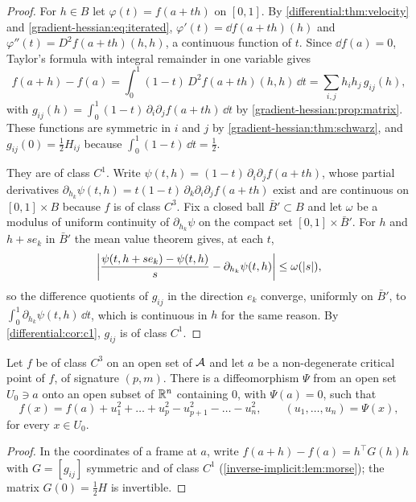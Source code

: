 \begin{notechapter}
\begin{proof}
For $h\in B$ let $\varphi(t) = f(a + th)$ on $[0, 1]$. By
\cref{differential:thm:velocity} and
\eqref{gradient-hessian:eq:iterated},
$\varphi'(t) = \dd f(a + th)(h)$ and
$\varphi''(t) = D^2f(a + th)(h, h)$, a continuous function of $t$. Since
$\dd f(a) = 0$, Taylor's formula with integral remainder in one variable
gives
\[
  f(a + h) - f(a) = \int_0^1(1 - t)\,D^2f(a + th)(h, h)\,\dd t
  = \sum_{i,j}h_ih_j\,g_{ij}(h) ,
\]
with
$g_{ij}(h) = \int_0^1(1 - t)\,\partial_i\partial_jf(a + th)\,\dd t$ by
\cref{gradient-hessian:prop:matrix}. These functions are symmetric in
$i$ and $j$ by \cref{gradient-hessian:thm:schwarz}, and
$g_{ij}(0) = \frac12H_{ij}$ because $\int_0^1(1 - t)\,\dd t = \frac12$.

They are of class $C^1$. Write
$\psi(t, h) = (1 - t)\,\partial_i\partial_jf(a + th)$, whose partial
derivatives
$\partial_{h_k}\psi(t, h)
= t(1 - t)\,\partial_k\partial_i\partial_jf(a + th)$
exist and are continuous on $[0, 1]\times B$ because $f$ is of class
$C^3$. Fix a closed ball $\bar B'\subset B$ and let $\omega$ be a
modulus of uniform continuity of $\partial_{h_k}\psi$ on the compact set
$[0, 1]\times\bar B'$. For $h$ and $h + se_k$ in $\bar B'$ the mean
value theorem gives, at each $t$,
\[
  \left|\frac{\psi(t, h + se_k) - \psi(t, h)}s
  - \partial_{h_k}\psi(t, h)\right|\leq\omega(\left|s\right|) ,
\]
so the difference quotients of $g_{ij}$ in the direction $e_k$ converge,
uniformly on $\bar B'$, to $\int_0^1\partial_{h_k}\psi(t, h)\,\dd t$,
which is continuous in $h$ for the same reason. By
\cref{differential:cor:c1}, $g_{ij}$ is of class $C^1$.
\end{proof}

\begin{theorem}\label{inverse-implicit:thm:morse}
Let $f$ be of class $C^3$ on an open set of $\mathcal{A}$ and let $a$ be a
non-degenerate critical point of $f$, of signature $(p, m)$. There is a
diffeomorphism $\Psi$ from an open set $U_0\ni a$ onto an open subset of
$\mathbb{R}^n$ containing $0$, with $\Psi(a) = 0$, such that
\[
  f(x) = f(a) + u_1^2 + \dots + u_p^2 - u_{p+1}^2 - \dots - u_n^2 ,
  \qquad (u_1,\dots,u_n) = \Psi(x) ,
\]
for every $x\in U_0$.
\end{theorem}

\begin{proof}
In the coordinates of a frame at $a$, write
$f(a + h) - f(a) = h^\top G(h)h$ with $G = [g_{ij}]$ symmetric and of
class $C^1$ (\cref{inverse-implicit:lem:morse}); the matrix
$G(0) = \frac12H$ is invertible.


\end{proof}
\end{notechapter}

